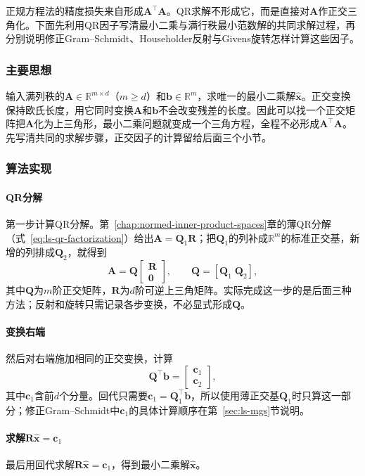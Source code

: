 正规方程法的精度损失来自形成$\bm A^\top\bm A$。QR求解不形成它，而是直接对$\bm A$作正交三角化。下面先利用QR因子写清最小二乘与满行秩最小范数解的共同求解过程，再分别说明修正Gram--Schmidt、Householder反射与Givens旋转怎样计算这些因子。

\subsubsection{主要思想}

输入满列秩的$\bm A\in\mathbb R^{m\times d}$（$m\geq d$）和$\bm b\in\mathbb R^m$，求唯一的最小二乘解$\hat{\bm x}$。正交变换保持欧氏长度，用它同时变换$\bm A$和$\bm b$不会改变残差的长度。因此可以找一个正交矩阵把$\bm A$化为上三角形，最小二乘问题就变成一个三角方程，全程不必形成$\bm A^\top\bm A$。先写清共同的求解步骤，正交因子的计算留给后面三个小节。

\subsubsection{算法实现}

\paragraph{QR分解}
第一步计算QR分解。第~\ref{chap:normed-inner-product-spaces}章的薄QR分解（式~\eqref{eq:ls-qr-factorization}）给出$\bm A=\bm Q_1\bm R$；把$\bm Q_1$的列补成$\mathbb R^m$的标准正交基，新增的列排成$\bm Q_2$，就得到
\[
 \bm A=\bm Q\begin{bmatrix}\bm R\\\bm0\end{bmatrix},\qquad \bm Q=[\bm Q_1\;\bm Q_2],
\]
其中$\bm Q$为$m$阶正交矩阵，$\bm R$为$d$阶可逆上三角矩阵。实际完成这一步的是后面三种方法；反射和旋转只需记录各步变换，不必显式形成$\bm Q$。

\paragraph{变换右端}
然后对右端施加相同的正交变换，计算
\[
 \bm Q^\top\bm b=\begin{bmatrix}\bm c_1\\\bm c_2\end{bmatrix},
\]
其中$\bm c_1$含前$d$个分量。回代只需要$\bm c_1=\bm Q_1^\top\bm b$，所以使用薄正交基$\bm Q_1$时只算这一部分；修正Gram--Schmidt中$\bm c_1$的具体计算顺序在第~\ref{sec:ls-mgs}节说明。

\paragraph{求解\texorpdfstring{$\bm R\hat{\bm x}=\bm c_1$}{Rx=c1}}
最后用回代求解$\bm R\hat{\bm x}=\bm c_1$，得到最小二乘解$\hat{\bm x}$。

